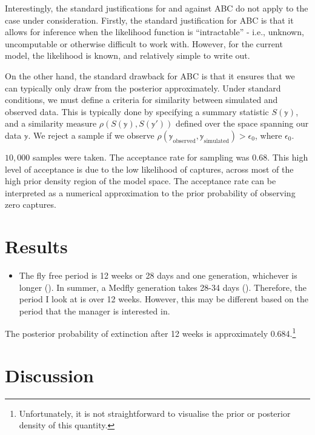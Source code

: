 \documentclass[
  oneside]{book}
\providecommand{\tightlist}{%
  \setlength{\itemsep}{0pt}\setlength{\parskip}{0pt}}
\begin{document}
Interestingly, the standard justifications for and against ABC do not apply to the case under consideration. Firstly, the standard justification for ABC is that it allows for inference when the likelihood function is ``intractable'' - i.e., unknown, uncomputable or otherwise difficult to work with. However, for the current model, the likelihood is known, and relatively simple to write out.

On the other hand, the standard drawback for ABC is that it ensures that we can typically only draw from the posterior approximately. Under standard conditions, we must define a criteria for similarity between simulated and observed data. This is typically done by specifying a summary statistic \(S(\mathbb y)\), and a similarity measure \(\rho(S(\mathbb y), S(\mathbb y'))\) defined over the space spanning our data \(\mathbb y\). We reject a sample if we observe \(\rho(\mathbb y_{\text{observed}}, \mathbb y_{\text{simulated}} ) > \epsilon_0\), where \(\epsilon_0\).

\(10{,}000\) samples were taken. The acceptance rate for sampling was 0.68. This high level of acceptance is due to the low likelihood of captures, across most of the high prior density region of the model space. The acceptance rate can be interpreted as a numerical approximation to the prior probability of observing zero captures.

\hypertarget{results}{%
\section{Results}\label{results}}

\begin{itemize}
\tightlist
\item
  The fly free period is 12 weeks or 28 days and one generation, whichever is longer (\citet{meats2005}). In summer, a Medfly generation takes 28-34 days (\citet{dpirdwa}). Therefore, the period I look at is over 12 weeks. However, this may be different based on the period that the manager is interested in.
\end{itemize}

The posterior probability of extinction after 12 weeks is approximately 0.684.\footnote{Unfortunately, it is not straightforward to visualise the prior or posterior density of this quantity.}

\hypertarget{discussion}{%
\section{Discussion}\label{discussion}}
\end{document}
